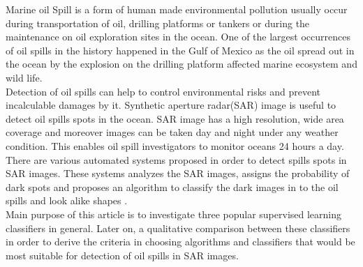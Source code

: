 Marine oil Spill is a form of human made environmental pollution usually occur during transportation of oil, drilling platforms or tankers \cite{Zhang201476}or during the maintenance on oil exploration sites in the ocean. One of the largest occurrences of oil spills in the history happened in the Gulf of Mexico as the oil spread out in the ocean by the explosion on the drilling platform affected marine ecosystem and wild life\cite{Bozeman2011244}.\\
Detection of oil spills can help to control environmental risks and prevent incalculable damages by it. Synthetic aperture radar(SAR) image is useful to detect oil spills spots in the ocean. SAR image has a high resolution, wide area coverage and moreover images can be taken day and night under any weather condition. This enables oil spill investigators to monitor oceans 24 hours a day\cite{Chang20081915}.\\
There are various automated systems proposed in order to detect spills spots in SAR images. These systems analyzes the SAR images, assigns the probability of dark spots and proposes an algorithm to classify the dark images in to the oil spills and look alike shapes \cite{Xu201414,brekke2008classifiers,Keramitsoglou2006640,Guo2014146}.\\
Main purpose of this article is to  investigate three popular supervised learning classifiers in general. Later on, a qualitative comparison between these classifiers in order to derive the criteria in choosing algorithms and classifiers that would be most suitable for detection of oil spills in SAR images. 